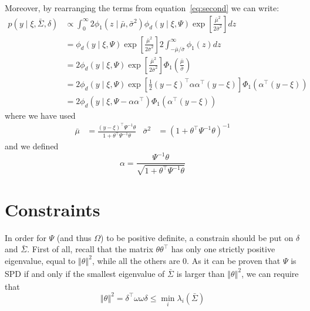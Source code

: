 \documentclass[fleqn]{article}
\theoremstyle{theorem}
\theoremstyle{definition}
\newcommand{\norm}[2][]{\left\Vert#2\right\Vert_{#1}}
\begin{document}
    Moreover, by rearranging the terms from equation~\eqref{eq:second} we can write:
    \begin{align*}
        p(y\mid \xi, \bar\Sigma, \delta) &\propto \int_0^\infty 2\phi_1(z\mid\bar\mu,\bar\sigma^2) \phi_d\!\left(y\mid \xi, \Psi\right) \exp\left[\frac{\bar\mu^2}{2\bar\sigma^2}\right]dz\\
        &= \phi_d\!\left(y\mid \xi, \Psi\right) \exp\left[\frac{\bar\mu^2}{2\bar\sigma^2}\right] 2 \int_{-\bar\mu/\bar\sigma}^\infty\phi_1(z)dz\\
        &= 2\phi_d\!\left(y\mid \xi, \Psi\right) \exp\left[\frac{\bar\mu^2}{2\bar\sigma^2}\right]\Phi_1\!\left(\frac{\bar\mu}{\bar\sigma}\right)\\
        &= 2\phi_d\!\left(y\mid \xi, \Psi\right) \exp\left[\frac{1}{2}(y-\xi)^\top\alpha\alpha^\top(y-\xi)\right]\Phi_1\!\left(\alpha^\top(y-\xi)\right)\\
        &= 2\phi_d\!\left(y\mid \xi, \Psi - \alpha\alpha^\top\right) \Phi_1\!\left(\alpha^\top(y-\xi)\right)
    \end{align*}
    where we have used
    \begin{align*}
        \bar\mu &= \frac{(y-\xi)^\top\Psi^{-1}\theta}{1 + \theta^\top\Psi^{-1}\theta}        &       \bar\sigma^2 &= \left(1 + \theta^\top\Psi^{-1}\theta\right)^{-1}
    \end{align*}
    and we defined
    \begin{equation*}
        \alpha = \frac{\Psi^{-1}\theta}{\sqrt{1 + \theta^\top\Psi^{-1}\theta}}
    \end{equation*}

    \section{Constraints}
    In order for $\Psi$ (and thus $\Omega$) to be positive definite, a constrain should be put on $\delta$ and $\bar\Sigma$.  First of all, recall that the matrix $\theta\theta^\top$ has only one strictly positive eigenvalue, equal to $\norm{\theta}^2$, while all the others are 0. As it can be proven that $\Psi$ is SPD if and only if the smallest eigenvalue of $\bar\Sigma$ is larger than $\norm{\theta}^2$, we can require that
    \begin{equation*}
        \norm{\theta}^2 = \delta^\top\omega\omega\delta \leq \min_i\lambda_i(\bar\Sigma)
    \end{equation*}
\end{document}
